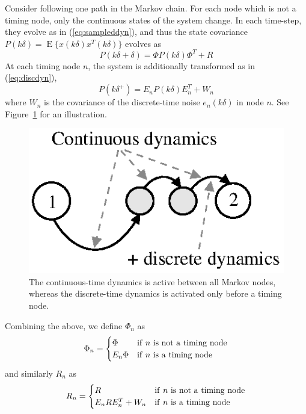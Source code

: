 \documentclass[final,twoside]{rapport}  %
\DeclareMathOperator{\E}{E}
\begin{document}
Consider following one path in the Markov chain. For each node
which is not a timing node, only the continuous states of the
system change. In each time-step, they evolve as in
(\ref{eq:sampleddyn}), and thus the state covariance $P(k\delta) = \E \bigl \{
x(k\delta)x^T\!(k\delta) \bigr \}$ evolves as
\begin{equation*}
P(k\delta+\delta) = \Phi P(k\delta) \Phi^T + R
\end{equation*}
At each timing node $n$, the system is additionally transformed as
in (\ref{eq:discdyn}),
\begin{equation*}
P(k\delta^+) = E_n P(k\delta) E_n^T + W_n 
\end{equation*}
where $W_n$ is the covariance of the discrete-time noise $e_n(k\delta)$ in node
$n$. See Figure~\ref{fig:jumppath} for an illustration.
\begin{figure}[tbp]
\center
\includegraphics[scale=.8]{jumppath.ps}
\caption{The continuous-time dynamics is active between all Markov
  nodes, whereas the discrete-time dynamics is activated only before
  a timing node.}
\label{fig:jumppath}
\end{figure}
Combining the above, we define $\Phi_{n}$ as
\begin{equation*}
\Phi_{n} = \begin{cases}
\Phi & {\rm if}~n~{\rm is~not~a~timing~node}\\
E_n \Phi & {\rm if}~n~{\rm is~a~timing~node}
\end{cases}
\end{equation*}
and similarly $R_{n}$ as
\begin{equation*}
R_{n} = \begin{cases}
R & {\rm if}~n~{\rm is~not~a~timing~node}\\
E_n R E_n^T + W_n & {\rm if}~n~{\rm is~a~timing~node}
\end{cases}
\end{equation*}
\end{document}
